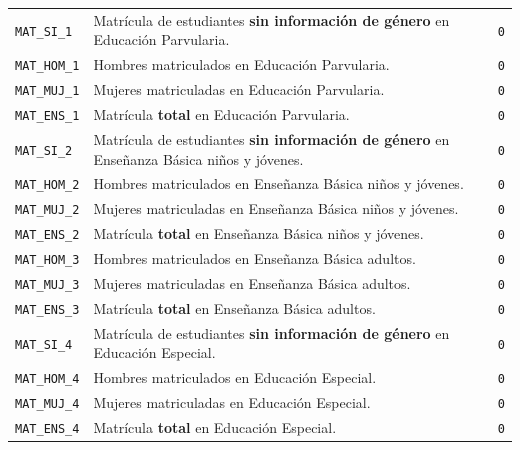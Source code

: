 \documentclass[10.5pt]{article}
\begin{document}
\begin{xltabular}{\linewidth}{@{}p{4.5cm} >{\raggedright\arraybackslash}X p{3.4cm}@{}}
\texttt{MAT\_\allowbreak{}SI\_\allowbreak{}1} & Matrícula de estudiantes \textbf{sin información de género} en Educación Parvularia. & \texttt{0} \\
\texttt{MAT\_\allowbreak{}HOM\_\allowbreak{}1} & Hombres matriculados en Educación Parvularia. & \texttt{0} \\
\texttt{MAT\_\allowbreak{}MUJ\_\allowbreak{}1} & Mujeres matriculadas en Educación Parvularia. & \texttt{0} \\
\texttt{MAT\_\allowbreak{}ENS\_\allowbreak{}1} & Matrícula \textbf{total} en Educación Parvularia. & \texttt{0} \\
\texttt{MAT\_\allowbreak{}SI\_\allowbreak{}2} & Matrícula de estudiantes \textbf{sin información de género} en Enseñanza Básica niños y jóvenes. & \texttt{0} \\
\texttt{MAT\_\allowbreak{}HOM\_\allowbreak{}2} & Hombres matriculados en Enseñanza Básica niños y jóvenes. & \texttt{0} \\
\texttt{MAT\_\allowbreak{}MUJ\_\allowbreak{}2} & Mujeres matriculadas en Enseñanza Básica niños y jóvenes. & \texttt{0} \\
\texttt{MAT\_\allowbreak{}ENS\_\allowbreak{}2} & Matrícula \textbf{total} en Enseñanza Básica niños y jóvenes. & \texttt{0} \\
\texttt{MAT\_\allowbreak{}HOM\_\allowbreak{}3} & Hombres matriculados en Enseñanza Básica adultos. & \texttt{0} \\
\texttt{MAT\_\allowbreak{}MUJ\_\allowbreak{}3} & Mujeres matriculadas en Enseñanza Básica adultos. & \texttt{0} \\
\texttt{MAT\_\allowbreak{}ENS\_\allowbreak{}3} & Matrícula \textbf{total} en Enseñanza Básica adultos. & \texttt{0} \\
\texttt{MAT\_\allowbreak{}SI\_\allowbreak{}4} & Matrícula de estudiantes \textbf{sin información de género} en Educación Especial. & \texttt{0} \\
\texttt{MAT\_\allowbreak{}HOM\_\allowbreak{}4} & Hombres matriculados en Educación Especial. & \texttt{0} \\
\texttt{MAT\_\allowbreak{}MUJ\_\allowbreak{}4} & Mujeres matriculadas en Educación Especial. & \texttt{0} \\
\texttt{MAT\_\allowbreak{}ENS\_\allowbreak{}4} & Matrícula \textbf{total} en Educación Especial. & \texttt{0} \\

\end{xltabular}
\end{document}
